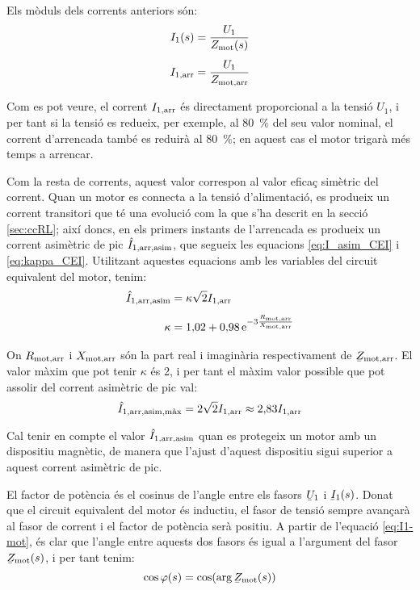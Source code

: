 Els mòduls dels corrents anteriors són:
\begin{subequations}
\begin{align}
    I_1(s) &= \frac{U_1}{Z_\mathrm{mot}(s)} \label{eq:mot-I1}\\[1ex]
    I_\mathrm{1,arr} &= \frac{U_1}{Z_\mathrm{mot,arr}}\label{eq:mot-Iarr}
\end{align}
\end{subequations}

Com es pot veure, el corrent $I_\mathrm{1,arr}$ és directament proporcional a la tensió $U_1$, i per tant si la tensió es redueix, per exemple, al \SI{80}{\%} del seu valor nominal, el corrent d'arrencada també es reduirà al \SI{80}{\%}; en aquest cas el motor trigarà més temps a arrencar.

Com la resta de corrents, aquest valor correspon al valor eficaç simètric del corrent. Quan un motor es connecta a la tensió d'alimentació, es produeix un corrent transitori que té una evolució com la que s'ha descrit en la secció \vref{sec:ccRL}; així doncs, en els primers instants de l'arrencada es produeix un corrent asimètric de pic $\hat{I}_\mathrm{1,arr,asim}$, que segueix les equacions \eqref{eq:I_asim_CEI} i \eqref{eq:kappa_CEI}. Utilitzant aquestes equacions amb les variables del circuit equivalent del motor, tenim:
\begin{subequations}
\begin{align}
    \hat{I}_\mathrm{1,arr,asim} &= \kappa \sqrt{2} I_\mathrm{1,arr}  \\[1ex]
    \kappa &= 1{,}02 + 0{,}98 \,\mathrm{e}^{-3\frac{R_\mathrm{mot,arr}}{X_\mathrm{mot,arr}}}
\end{align}
\end{subequations}

On $R_\mathrm{mot,arr}$ i $X_\mathrm{mot,arr}$ són la part real i imaginària respectivament de $\cmplx{Z}\ped{mot,arr}$. El valor màxim que pot tenir  $\kappa$ és 2, i per tant el màxim valor possible que pot assolir del corrent asimètric de pic val:
\begin{equation}
	\hat{I}_\mathrm{1,arr,asim,\text{màx}} =  2\sqrt{2} I_\mathrm{1,arr} \approx 2{,}83 I_\mathrm{1,arr} 
\end{equation}

Cal tenir en compte el valor $\hat{I}_\mathrm{1,arr,asim}$ quan es protegeix un motor amb un dispositiu magnètic, de manera que l'ajust d'aquest dispositiu sigui superior a aquest corrent asimètric de  pic.

El factor de potència és el cosinus de l'angle entre els fasors $\cmplx{U}_1$ i $\cmplx{I}_1(s)$. Donat que el circuit equivalent del motor és inductiu, el fasor de tensió sempre avançarà al fasor de corrent i el factor de potència serà positiu. A partir de l'equació \eqref{eq:I1-mot}, és clar que l'angle entre aquests dos fasors és igual a l'argument del fasor $\cmplx{Z}\ped{mot}(s)$, i per tant tenim:
\begin{equation}\index{motors d'inducció!factor de potència}
	\cos\varphi(s) = \cos(\arg\cmplx{Z}\ped{mot}(s))\label{eq:cos-fi-mot}
\end{equation}

